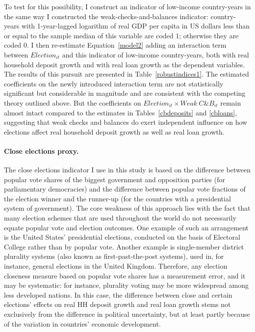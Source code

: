 \documentclass[12pt,a4paper]{article}
\begin{document}
To test for this possibility, I construct an indicator of low-income country-years in the same way I constructed the weak-checks-and-balances indicator: country-years with 1-year-lagged logarithm of real GDP per capita in US dollars less than or equal to the sample median of this variable are coded 1; otherwise they are coded 0. I then re-estimate Equation~\eqref{model2} adding an interaction term between $Election_{it}$ and this indicator of low-income country-years, both with real household deposit growth and with real loan growth as the dependent variables. The results of this pursuit are presented in Table~\ref{robustindices1}. The estimated coefficients on the newly introduced interaction term are not statistically significant but considerable in magnitude and are consistent with the competing theory outlined above. But the coefficients on $Election_{it} \times Weak\ C\&B_{it}$ remain almost intact compared to the estimates in Tables~\ref{cbdeposits} and \ref{cbloans}, suggesting that weak checks and balances do exert independent influence on how elections affect real household deposit growth as well as real loan growth.

\paragraph{Close elections proxy.} The close elections indicator I use in this study is based on the difference between popular vote shares of the biggest government and opposition parties (for parliamentary democracies) and the difference between popular vote fractions of the election winner and the runner-up (for the countries with a presidential system of government). The core weakness of this approach lies with the fact that many election schemes that are used throughout the world do not necessarily equate popular vote and election outcomes. One example of such an arrangement is the United States' presidential elections, conducted on the basis of Electoral College rather than by popular vote. Another example is single-member district plurality systems (also known as first-past-the-post systems), used in, for instance, general elections in the United Kingdom. Therefore, any election closeness measure based on popular vote shares has a measurement error, and it may be systematic: for instance, plurality voting may be more widespread among less developed nations. In this case, the difference between close and certain elections' effects on real HH deposit growth and real loan growth stems not exclusively from the difference in political uncertainty, but at least partly because of the variation in countries' economic development.
\end{document}
